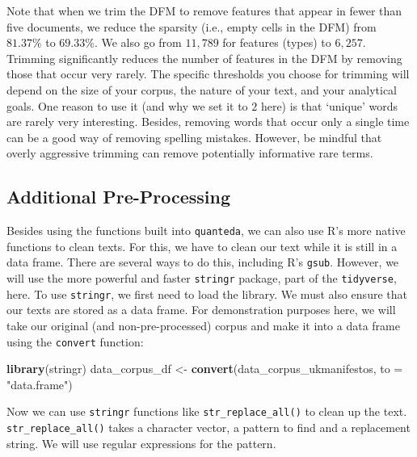 \documentclass[
]{book}
\newenvironment{Shaded}{\begin{snugshade}}{\end{snugshade}}
\newcommand{\AttributeTok}[1]{\textcolor[rgb]{0.13,0.29,0.53}{#1}}
\newcommand{\FunctionTok}[1]{\textcolor[rgb]{0.13,0.29,0.53}{\textbf{#1}}}
\newcommand{\NormalTok}[1]{#1}
\newcommand{\OtherTok}[1]{\textcolor[rgb]{0.56,0.35,0.01}{#1}}
\newcommand{\StringTok}[1]{\textcolor[rgb]{0.31,0.60,0.02}{#1}}
\begin{document}
Note that when we trim the DFM to remove features that appear in fewer than five documents, we reduce the sparsity (i.e., empty cells in the DFM) from \(81.37\%\) to \(69.33\%\). We also go from \(11,789\) for features (types) to \(6,257\). Trimming significantly reduces the number of features in the DFM by removing those that occur very rarely. The specific thresholds you choose for trimming will depend on the size of your corpus, the nature of your text, and your analytical goals. One reason to use it (and why we set it to \(2\) here) is that `unique' words are rarely very interesting. Besides, removing words that occur only a single time can be a good way of removing spelling mistakes. However, be mindful that overly aggressive trimming can remove potentially informative rare terms.

\subsection{Additional Pre-Processing}\label{additional-pre-processing}

Besides using the functions built into \texttt{quanteda}, we can also use R's more native functions to clean texts. For this, we have to clean our text while it is still in a data frame. There are several ways to do this, including R's \texttt{gsub}. However, we will use the more powerful and faster \texttt{stringr} package, part of the \texttt{tidyverse}, here. To use \texttt{stringr}, we first need to load the library. We must also ensure that our texts are stored as a data frame. For demonstration purposes here, we will take our original (and non-pre-processed) corpus and make it into a data frame using the \texttt{convert} function:

\begin{Shaded}
\begin{Highlighting}[]
\FunctionTok{library}\NormalTok{(stringr)}
\NormalTok{data\_corpus\_df }\OtherTok{\textless{}{-}} \FunctionTok{convert}\NormalTok{(data\_corpus\_ukmanifestos, }\AttributeTok{to =} \StringTok{"data.frame"}\NormalTok{)}
\end{Highlighting}
\end{Shaded}

Now we can use \texttt{stringr} functions like \texttt{str\_replace\_all()} to clean up the text. \texttt{str\_replace\_all()} takes a character vector, a pattern to find and a replacement string. We will use regular expressions for the pattern.
\end{document}

